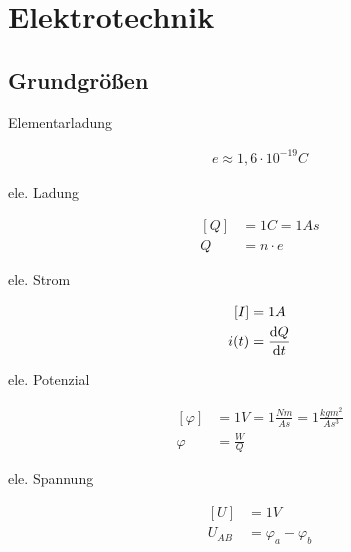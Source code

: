 \chapter{Elektrotechnik}
\section{Grundgrößen}

\begin{boxleft}Elementarladung
\end{boxleft}\begin{boxrightshaded}
\begin{align}
e\approx 1,6\cdot 10^{-19}C
\end{align}
\end{boxrightshaded}

\begin{boxleft}ele. Ladung
\end{boxleft}\begin{boxrightshaded}
\begin{align}
\left[Q\right]&=1C=1As\\
Q&=n\cdot e
\end{align}
\end{boxrightshaded}

\begin{boxleft}ele. Strom
\end{boxleft}\begin{boxrightshaded}
\begin{align}
\left[I\right]&=1A\\
i(t)&=\frac{\mathop{}\!\mathrm{d} Q}{\mathop{}\!\mathrm{d} t}
\end{align}
\end{boxrightshaded}

\begin{boxleft}ele. Potenzial
\end{boxleft}\begin{boxrightshaded}
\begin{align}
\left[\varphi\right]&=1V=1\frac{Nm}{As}=1\frac{kgm^2}{As^3}\\
\varphi&=\frac{W}{Q}
\end{align}
\end{boxrightshaded}

\begin{boxleft}ele. Spannung
\end{boxleft}\begin{boxrightshaded}
\begin{align}
\left[U\right]&=1V\\
U_{AB}&=\varphi_a-\varphi_b
\end{align}
\end{boxrightshaded}